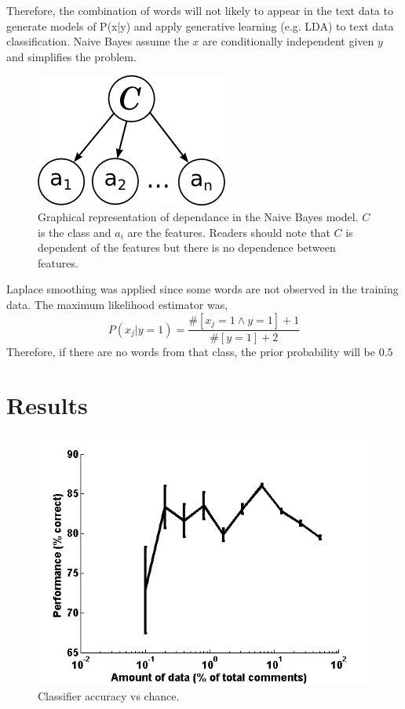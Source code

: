 \documentclass[10pt,twocolumn]{article}
\begin{document}
Therefore, the combination of words will not likely to appear in the text data to generate models of P(x|y) and apply generative learning (e.g. LDA) to text data classification.
Naive Bayes assume the $x$ are conditionally independent given $y$ and simplifies the problem.\autocite{jordan2002discriminative}

\begin{figure}
  	\includegraphics[scale=1.0]{./sysmag_bayes.png}
  	\caption{Graphical representation of dependance in the Naive Bayes model. $C$ is the class and $a_i$ are the features. Readers should note that $C$ is dependent of the features but there is no dependence between features. }
  	\label{fig:RSUencountered}
\end{figure}

Laplace smoothing was applied since some words are not observed in the training data. The maximum likelihood estimator was,
\[
P(x_j|y=1) = \frac {\#[x_j=1 \land y=1]+1}{\#[y=1]+2}
\]
Therefore, if there are no words from that class, the prior probability will be $0.5$

\section{Results}

\begin{figure}
    \centering
  	\includegraphics[scale=0.5]{./binary_data.png}
  	\caption{Classifier accuracy vs chance.}
  	\label{fig:RSUencountered}
\end{figure}		
	
\end{document}
